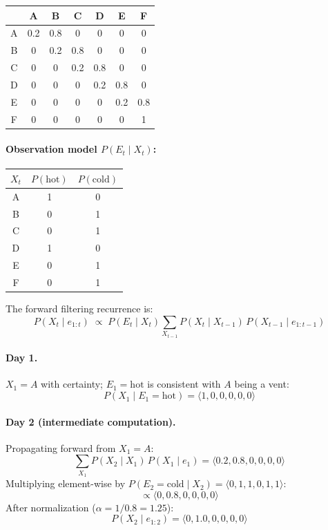 \documentclass[12pt]{article}
\begin{document}
\begin{center}
\begin{tabular}{ccccccc}
\toprule
& A & B & C & D & E & F \\
\midrule
A & 0.2 & 0.8 & 0 & 0 & 0 & 0 \\
B & 0 & 0.2 & 0.8 & 0 & 0 & 0 \\
C & 0 & 0 & 0.2 & 0.8 & 0 & 0 \\
D & 0 & 0 & 0 & 0.2 & 0.8 & 0 \\
E & 0 & 0 & 0 & 0 & 0.2 & 0.8 \\
F & 0 & 0 & 0 & 0 & 0 & 1 \\
\bottomrule
\end{tabular}
\end{center}

\paragraph{Observation model $P(E_t\mid X_t)$:}

\begin{center}
\begin{tabular}{ccc}
\toprule
$X_t$ & $P(\text{hot})$ & $P(\text{cold})$\\
\midrule
A & 1 & 0\\
B & 0 & 1\\
C & 0 & 1\\
D & 1 & 0\\
E & 0 & 1\\
F & 0 & 1\\
\bottomrule
\end{tabular}
\end{center}

The forward filtering recurrence is:
\[
P(X_t\mid e_{1:t})\;\propto\;
P(E_t\mid X_t)\sum_{X_{t-1}}P(X_t\mid X_{t-1})\,P(X_{t-1}\mid e_{1:t-1})
\]

\paragraph{Day 1.}
$X_1=A$ with certainty; $E_1=\text{hot}$ is consistent with $A$ being a vent:
\[
P(X_1\mid E_1{=}\text{hot})=\langle1,0,0,0,0,0\rangle
\]

\paragraph{Day 2 (intermediate computation).}
Propagating forward from $X_1=A$:
\[
\sum_{X_1}P(X_2\mid X_1)\,P(X_1\mid e_1)
=\langle0.2,0.8,0,0,0,0\rangle
\]
Multiplying element-wise by $P(E_2{=}\text{cold}\mid X_2)=\langle0,1,1,0,1,1\rangle$:
\[
\propto\langle0,0.8,0,0,0,0\rangle
\]
After normalization ($\alpha=1/0.8=1.25$):
\[
P(X_2\mid e_{1:2})=\langle0,1.0,0,0,0,0\rangle
\]
\end{document}
